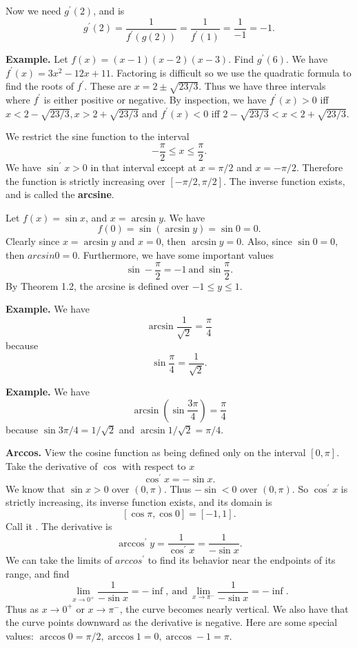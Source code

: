       Now we need $g^\prime(2)$, and is
      \[g^\prime(2) = \frac{1}{f^\prime(g(2))} = \frac{1}{f^\prime(1)} = \frac{1}{-1} = -1.\]
      
      \textbf{Example.} Let $f(x) = (x-1)(x-2)(x-3)$. Find $g^\prime(6)$. We have $f^\prime(x) = 3x^2 - 12x + 11$. Factoring is difficult so we use the quadratic formula to find the roots of $f^\prime$. These are $x = 2 \pm \sqrt{23/3}$. Thus we have three intervals where $f^\prime$ is either positive or negative. By inspection, we have $f^\prime(x) > 0$ iff $x < 2 - \sqrt{23/3}, x > 2 + \sqrt{23/3}$ and $f^\prime(x) < 0$ iff $2 - \sqrt{23/3} < x < 2 + \sqrt{23/3}$.

      We restrict the sine function to the interval
      \[-\frac{\pi}{2} \le x \le \frac{\pi}{2}.\]
      We have $\sin^\prime x > 0$ in that interval except at $x = \pi/2$ and $x = -\pi/2$. Therefore the function is strictly increasing over $[-\pi/2, \pi/2]$. The inverse function exists, and is called the \textbf{arcsine}.

      Let $f(x) = \sin x$, and $x = \arcsin y$. We have
      \[f(0) = \sin(\arcsin y) = \sin 0 = 0.\]
      Clearly since $x = \arcsin y$ and $x = 0$, then $\arcsin y = 0$. Also, since $\sin 0 = 0$, then $arcsin 0 = 0$. Furthermore, we have some important values
      \[\sin -\frac{\pi}{2} = -1\: \text{and}\: \sin \frac{\pi}{2}.\]
      By Theorem 1.2, the arcsine is defined over $-1 \le y \le 1$.

      \textbf{Example.} We have
      \[\arcsin \frac{1}{\sqrt{2}} = \frac{\pi}{4}\]
      because
      \[\sin \frac{\pi}{4} = \frac{1}{\sqrt{2}}.\]

      \textbf{Example.} We have
      \[\arcsin(\sin \frac{3\pi}{4}) = \frac{\pi}{4}\]
      because $\sin 3\pi/4 = 1/\sqrt{2}$ and $\arcsin 1/\sqrt{2} = \pi/4$.

      \textbf{Arccos.} View the cosine function as being defined only on the interval $[0, \pi]$. Take the derivative of $\cos$ with respect to $x$
      \[\cos^\prime x = -\sin x.\]
      We know that $\sin x > 0$ over $(0, \pi)$. Thus $-\sin < 0$ over $(0, \pi)$. So $\cos^\prime x$ is strictly increasing, its inverse function exists, and its domain is
      \[[\cos \pi, \cos 0] = [-1, 1].\]
      Call it \arccos. The derivative is
      \[\arccos^\prime y = \frac{1}{\cos^\prime x} = \frac{1}{-\sin x}.\]
      We can take the limits of $arccos^\prime$ to find its behavior near the endpoints of its range, and find
      \[\lim_{x\to0^+} \frac{1}{-\sin x} = -\inf,\: \text{and}\: \lim_{x\to\pi^-} \frac{1}{-\sin x} = -\inf.\]
      Thus as $x\to0^+$ or $x\to\pi^-$, the curve becomes nearly vertical. We also have that the curve points downward as the derivative is negative. Here are some special values: $\arccos 0 = \pi/2, \arccos 1 = 0, \arccos -1 = \pi$.

